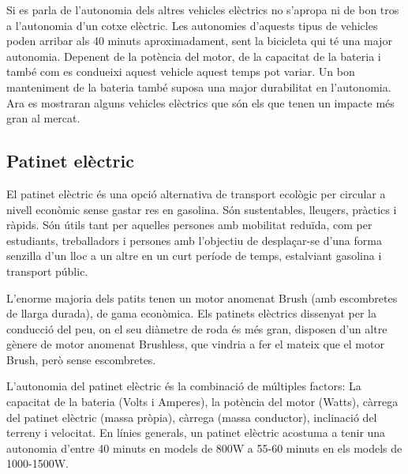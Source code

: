 Si es parla de l'autonomia dels altres vehicles elèctrics no s'apropa ni de bon tros a l'autonomia d'un cotxe elèctric. Les autonomies d'aquests tipus de vehicles poden arribar als 40 minuts aproximadament, sent la bicicleta qui té una major autonomia. Depenent de la potència del motor, de la capacitat de la bateria i també com es condueixi aquest vehicle aquest temps pot variar. Un bon manteniment de la bateria també suposa una major durabilitat en l'autonomia. Ara es mostraran alguns vehicles elèctrics que són els que tenen un impacte més gran al mercat.

\subsection{Patinet elèctric}
El patinet elèctric és una opció alternativa de transport ecològic per circular a nivell econòmic sense gastar res en gasolina. Són sustentables, lleugers, pràctics i ràpids. Són útils tant per aquelles persones amb mobilitat reduïda, com per estudiants, treballadors i persones amb l'objectiu de desplaçar-se d'una forma senzilla d'un lloc a un altre en un curt període de temps, estalviant gasolina i transport públic.

L'enorme majoria dels patits tenen un motor anomenat Brush (amb escombretes de llarga durada), de gama econòmica. Els patinets elèctrics dissenyat per la conducció del peu, on el seu diàmetre de roda és més gran, disposen d'un altre gènere de motor anomenat Brushless, que vindria a fer el mateix que el motor Brush, però sense escombretes. \bigskip

L'autonomia del patinet elèctric és la combinació de múltiples factors: La capacitat de la bateria (Volts i Amperes), la potència del motor (Watts), càrrega del patinet elèctric (massa pròpia), càrrega (massa conductor), inclinació del terreny i velocitat.
En línies generals, un patinet elèctric acostuma a tenir una autonomia d'entre 40 minuts en models de 800W a 55-60 minuts en els models de 1000-1500W.
\bigskip

